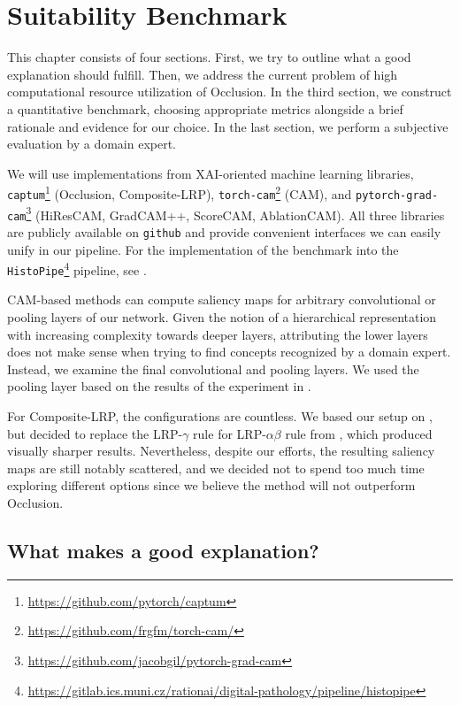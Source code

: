 \chapter{Suitability Benchmark}\label{experiment}

This chapter consists of four sections. First, we try to outline what a good explanation should fulfill.
Then, we address the current problem of high computational resource utilization of Occlusion.
In the third section, we construct a quantitative benchmark, choosing appropriate metrics alongside a brief rationale and evidence for our choice.
In the last section, we perform a subjective evaluation by a domain expert.

We will use implementations from XAI-oriented machine learning libraries, \texttt{captum}\footnote{\url{https://github.com/pytorch/captum}} (Occlusion, Composite-LRP), \texttt{torch-cam}\footnote{\url{https://github.com/frgfm/torch-cam/}} (CAM), and \texttt{pytorch-grad-cam}\footnote{\url{https://github.com/jacobgil/pytorch-grad-cam}} (HiResCAM, GradCAM++, ScoreCAM, AblationCAM). All three libraries are publicly available on \texttt{github} and provide convenient interfaces we can easily unify in our pipeline.
For the implementation of the benchmark into the \texttt{HistoPipe}\footnote{\url{https://gitlab.ics.muni.cz/rationai/digital-pathology/pipeline/histopipe}} pipeline, see .

CAM-based methods can compute saliency maps for arbitrary convolutional or pooling layers of our network.
Given the notion of a hierarchical representation with increasing complexity towards deeper layers, attributing the lower layers does not make sense when trying to find concepts recognized by a domain expert.
Instead, we examine the final convolutional and pooling layers.
We used the pooling layer based on the results of the experiment in .

For Composite-LRP, the configurations are countless. We based our setup on , but decided to replace the LRP-$\gamma$ rule for LRP-$\alpha\beta$ rule from \cite{lrp-alpha-beta}, which produced visually sharper results.
Nevertheless, despite our efforts, the resulting saliency maps are still notably scattered, and we decided not to spend too much time exploring different options since we believe the method will not outperform Occlusion.


\section{What makes a good explanation?}

